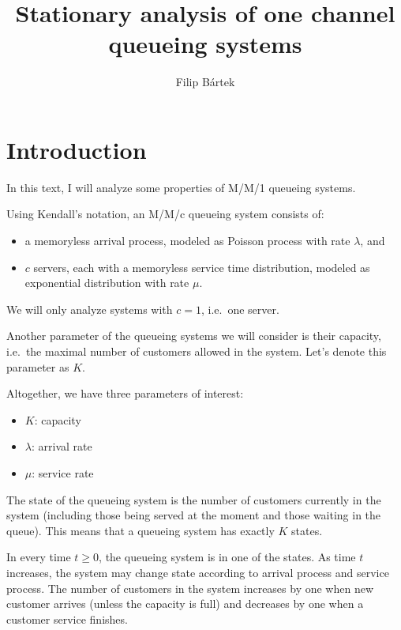 \documentclass{article}
\title{Stationary analysis of one channel queueing systems}
\author{Filip Bártek}
\begin{document}
\maketitle


\section{Introduction}

In this text, I will analyze some properties of M/M/1 queueing systems.

Using Kendall's notation\cite{wiki:kendall},
an M/M/c queueing system consists of:

\begin{itemize}
\item
a memoryless arrival process,
modeled as Poisson process with rate $\lambda$, and
\item
$c$ servers,
each with a memoryless service time distribution,
modeled as exponential distribution with rate $\mu$.
\end{itemize}

We will only analyze systems with $c = 1$, i.e.~one server.

Another parameter of the queueing systems we will consider
is their capacity,
i.e.~the maximal number of customers allowed in the system.
Let's denote this parameter as $K$.

Altogether, we have three parameters of interest:

\begin{itemize}
\item $K$: capacity
\item $\lambda$: arrival rate
\item $\mu$: service rate
\end{itemize}

The state of the queueing system is the number of customers
currently in the system (including those being served at the moment
and those waiting in the queue). This means that a queueing system has
exactly $K$ states.

In every time $t \geq 0$, the queueing system is in one of the states.
As time $t$ increases, the system may change state according to arrival
process and service process. The number of customers in the system
increases by one when new customer arrives (unless the capacity is full)
and decreases by one when a customer service finishes.
\end{document}
